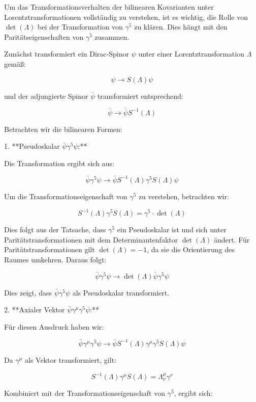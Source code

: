 Um das Transformationsverhalten der bilinearen Kovarianten unter Lorentztransformationen vollständig zu verstehen, ist es wichtig, die Rolle von \(\operatorname{det}(\Lambda)\) bei der Transformation von \(\gamma^5\) zu klären. Dies hängt mit den Paritätseigenschaften von \(\gamma^5\) zusammen.

Zunächst transformiert ein Dirac-Spinor \(\psi\) unter einer Lorentztransformation \(\Lambda\) gemäß:

\[
\psi \rightarrow S(\Lambda) \psi
\]

und der adjungierte Spinor \(\bar{\psi}\) transformiert entsprechend:

\[
\bar{\psi} \rightarrow \bar{\psi} S^{-1}(\Lambda)
\]

Betrachten wir die bilinearen Formen:

1. **Pseudoskalar \(\bar{\psi} \gamma^5 \psi\):**

Die Transformation ergibt sich aus:

\[
\bar{\psi} \gamma^5 \psi \rightarrow \bar{\psi} S^{-1}(\Lambda) \gamma^5 S(\Lambda) \psi
\]

Um die Transformationseigenschaft von \(\gamma^5\) zu verstehen, betrachten wir:

\[
S^{-1}(\Lambda) \gamma^5 S(\Lambda) = \gamma^5 \cdot \operatorname{det}(\Lambda)
\]

Dies folgt aus der Tatsache, dass \(\gamma^5\) ein Pseudoskalar ist und sich unter Paritätstransformationen mit dem Determinantenfaktor \(\operatorname{det}(\Lambda)\) ändert. Für Paritätstransformationen gilt \(\operatorname{det}(\Lambda) = -1\), da sie die Orientierung des Raumes umkehren. Daraus folgt:

\[
\bar{\psi} \gamma^5 \psi \rightarrow \operatorname{det}(\Lambda) \bar{\psi} \gamma^5 \psi
\]

Dies zeigt, dass \(\bar{\psi} \gamma^5 \psi\) als Pseudoskalar transformiert.

2. **Axialer Vektor \(\bar{\psi} \gamma^\mu \gamma^5 \psi\):**

Für diesen Ausdruck haben wir:

\[
\bar{\psi} \gamma^\mu \gamma^5 \psi \rightarrow \bar{\psi} S^{-1}(\Lambda) \gamma^\mu \gamma^5 S(\Lambda) \psi
\]

Da \(\gamma^\mu\) als Vektor transformiert, gilt:

\[
S^{-1}(\Lambda) \gamma^\mu S(\Lambda) = \Lambda_\nu^\mu \gamma^\nu
\]

Kombiniert mit der Transformationseigenschaft von \(\gamma^5\), ergibt sich:

